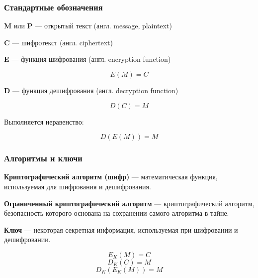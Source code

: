 \documentclass{beamer}
\newcommand{\define}[2]{{\bf #1} --- #2.\vspace{1em}}
\begin{document}
\begin{frame}
  \frametitle{Стандартные обозначения}

  \textbf{M} или \textbf{P} --- открытый текст (англ. message, plaintext)

  \textbf{C} --- шифротекст (англ. ciphertext)

  \vspace{1em}

  \textbf{E} --- функция шифрования (англ. encryption function)

  \[E(M)=C\]

  \vspace{1em}

  \textbf{D} --- функция дешифрования (англ. decryption function)

  \[D(C)=M\]

  \vspace{1em}

  Выполняется неравенство:
  
  \[D(E(M))=M\]
\end{frame}


\begin{frame}
  \frametitle{Алгоритмы и ключи}

  \define{Криптографический алгоритм (шифр)} {математическая функция, используемая для шифрования и дешифрования}

  \define{Ограниченный криптографический алгоритм} {криптографический алгоритм, безопасность которого основана на сохранении самого алгоритма в тайне}

  \define{Ключ} {некоторая секретная информация, используемая при шифровании и дешифровании}
  

  \[E_{K}(M)=C\]
  \[D_{K}(C)=M\]
  \[D_{K}(E_{K}(M))=M\]

\end{frame}

\end{document}
